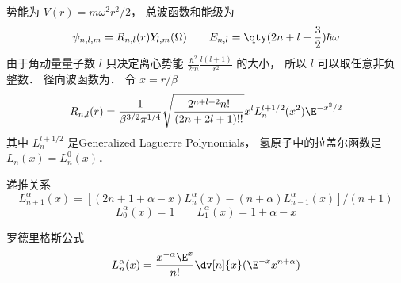 

势能为 $V(r) = m\omega^2 r^2/2$，  总波函数和能级为
\begin{equation}
\psi_{n,l,m} = R_{n,l}(r) Y_{l,m}(\Omega)
\qquad
E_{n,l} = \qty(2n + l + \frac32) \hbar \omega
\end{equation}    
由于角动量量子数 $l$ 只决定离心势能 $\frac{\hbar^2}{2m} \frac{l(l + 1)}{r^2}$  的大小， 所以 $l$ 可以取任意非负整数． 径向波函数为． 令 $x = r/\beta $
\begin{equation}
R_{n,l}(r) = \frac{1}{\beta^{3/2} \pi^{1/4}} \sqrt{\frac{2^{n+l+2} n!}{(2n + 2l + 1)!!}} x^l L_n^{l+1/2}(x^2) \E^{-x^2/2}
\end{equation}
其中 $L_n^{l+1/2}$ 是Generalized Laguerre Polynomials， 氢原子中的拉盖尔函数是 $L_n(x) = L_n^0(x)$． 

递推关系
\begin{equation}
L_{n+1}^\alpha (x) = [(2n + 1 + \alpha  - x)L_n^\alpha (x) - (n + \alpha )L_{n - 1}^\alpha (x)]/(n + 1)
\end{equation}
\begin{equation}
L_0^\alpha (x) = 1
\qquad
L_1^\alpha (x) = 1 + \alpha  - x
\end{equation}
    
罗德里格斯公式
\begin{equation}
L_n^\alpha (x) = \frac{x^{-\alpha} \E^x}{n!} \dv[n]{x} (\E^{-x} x^{n+\alpha})
\end{equation}


